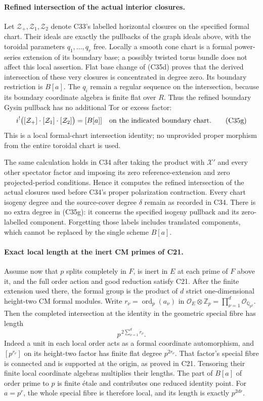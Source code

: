 \documentclass[11pt]{article}
\newcommand{\Q}{\mathbb Q}\newcommand{\C}{\mathbb C}\newcommand{\Z}{\mathbb Z}\newcommand{\R}{\mathbb R}\newcommand{\A}{\mathbb A}\newcommand{\OO}{\mathcal O}
\theoremstyle{definition}\newtheorem{definition}[theorem]{Definition}\newtheorem{remark}[theorem]{Remark}
\begin{document}
\paragraph{Refined intersection of the actual interior closures.}
Let $\mathcal Z_+,\mathcal Z_1,\mathcal Z_2$ denote
C33's labelled horizontal closures on the specified
formal chart. Their ideals are exactly the pullbacks of
the graph ideals above, with the toroidal parameters
$q_1,\ldots,q_r$ free. Locally a smooth cone chart is a
formal power-series extension of its boundary base; a
possibly twisted torus bundle does not affect this local
assertion. Flat base change of (C35d) proves that the
derived intersection of these very closures is concentrated
in degree zero. Its boundary restriction is $B[a]$.
The $q_i$ remain a regular sequence on the intersection,
because its boundary coordinate algebra is finite flat
over $R$. Thus the refined boundary Gysin pullback has
no additional Tor or excess factor:
\[
 i^!\bigl([\mathcal Z_+]\cdot[\mathcal Z_1]
                         \cdot[\mathcal Z_2]\bigr)
       =[B[a]]\quad\hbox{on the indicated boundary chart}.
 \tag{C35g}
\]
This is a local formal-chart intersection identity; no
unprovided proper morphism from the entire toroidal
chart is used.

The same calculation holds in C34 after taking the product
with $\mathcal X'$ and every other spectator factor and
imposing its zero reference-extension and zero projected-period
conditions. Hence it computes the refined intersection of
the actual closures used before C34's proper polarization
contraction. Every chart isogeny degree and the source-cover
degree $\delta$ remain as recorded in C34. There is no
extra degree in (C35g): it concerns the specified isogeny
pullback and its zero-labelled component. Forgetting those
labels includes translated components, which cannot be
replaced by the single scheme $B[a]$.

\paragraph{Exact local length at the inert CM primes of C21.}
Assume now that $p$ splits completely in $F$, is inert in
$E$ at each prime of $F$ above it, and the full order action
and good reduction satisfy C21. After the finite extension
used there, the formal group is the product of $d$ strict
one-dimensional height-two CM formal modules. Write
$r_\nu=\operatorname{ord}_p(a_\nu)$ in
$\mathcal O_E\otimes\Z_p=\prod_{\nu=1}^d
\mathcal O_{\Q_{p^2}}$.
Then the completed intersection at the identity in the
geometric special fibre has length
\[
                 p^{\,2\sum_{\nu=1}^d r_\nu}.
 \tag{C35h}
\]
Indeed a unit in each local order acts as a formal
coordinate automorphism, and $[p^{r_\nu}]$ on its
height-two factor has finite flat degree $p^{2r_\nu}$.
That factor's special fibre is connected and is supported
at the origin, as proved in C21. Tensoring their finite
local coordinate algebras multiplies their lengths.
The part of $B[a]$ of order prime to $p$ is finite
\'etale and contributes one reduced identity point.
For $a=p^r$, the whole special fibre is therefore local,
and its length is exactly $p^{2dr}$.
\end{document}
